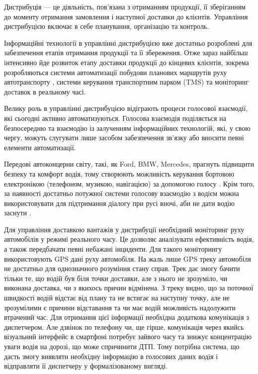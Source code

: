 Дистрибуція — це діяльність, пов'язана з отриманням продукції, її зберіганням до моменту отримання замовлення і наступної доставки до клієнтів. Управління дистрибуцією включає в себе планування, організацію та контроль.

Інформаційні технології в управлінні дистрибуцією вже достатньо розроблені для забезпечення етапів отримання продукції та її збереження. Отже зараз найбільш інтенсивно йде розвиток етапу доставки продукції до кінцевих клієнтів, зокрема розробляються системи автоматизації побудови планових маршрутів руху автотранспорту \cite{art1}, системи керування транспортним парком (TMS) та моніторинг доставок в реальному часі.

Велику роль в управлінні дистрибуцією відіграють процеси голосової взаємодії, які сьогодні активно автоматизуються. Голосова взаємодія поділяється на безпосередню та взаємодію із залученням інформаційних технологій, які, у свою чергу, можуть слугувати лише засобом забезпечення зв’язку або вносити певні елементи автоматизації.

Передові автоконцерни світу, такі, як Ford, BMW, Mercedes, прагнуть підвищити безпеку та комфорт водія, тому створюють можливість керування бортовою електронікою (телефоном, музикою, навігацією) за допомогою голосу \cite{Jonsson_2009}. Крім того, за наявності достатньо потужної системи голосову взаємодію з водієм можна використовувати для підтримання діалогу при русі вночі, аби не дати водію заснути \cite{Kravchenko_2012}.

Для управління доставкою вантажів у дистрибуції необхідний моніторинг руху автомобілів у режимі реального часу. Це дозволяє аналізувати ефективність водія, а також передбачати певні небажані інциденти. Для такого моніторингу використовують GPS дані руху автомобіля. На жаль лише GPS треку автомобіля не достатньо для однозначного розуміння стану справ. Трек дає змогу бачити тільки те, що водій був біля точки доставки, але  з нього  не зрозуміло, чи виконана доставка, чи з якихось причин відмінена. З треку видно, що за поточної швидкості водій відстає від плану та не встигає на наступну точку, але не зрозумілими є причини відставання та чи має водій можливість надолужити втрачений час. Для отримання цієї інформації необхідна додаткова комунікація з диспетчером. Але дзвінок по телефону чи, ще гірше, комунікація через якийсь візуальний інтерфейс в смартфоні потребує зайвого часу та знижує концентрацію уваги водія на дорозі, що може спричинити ДТП. Тому потрібна система, що дасть змогу виявляти необхідну інформацію в голосових даних водія і відправляти її диспетчеру у формалізованому вигляді.


